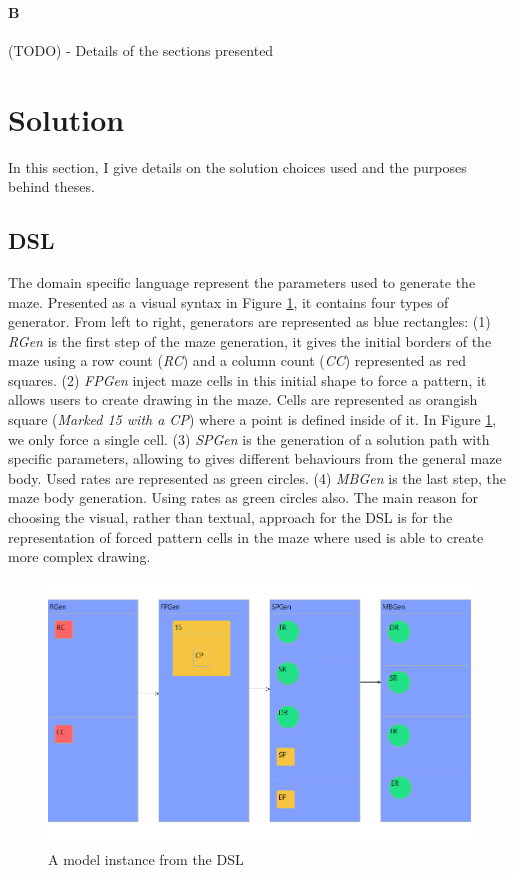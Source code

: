 \documentclass[review]{elsarticle}
\begin{document}
\paragraph{B}
(TODO) - Details of the sections presented

\section{Solution}

In this section, I give details on the solution choices used and the purposes behind theses.

\subsection{DSL}
The domain specific language represent the parameters used to generate the maze. Presented as a visual syntax in Figure \ref{fig:model}, it contains four types of generator. From left to right, generators are represented as blue rectangles: (1) \textit{RGen} is the first step of the maze generation, it gives the initial borders of the maze using a row count (\textit{RC}) and a column count (\textit{CC}) represented as red squares. (2) \textit{FPGen} inject maze cells in this initial shape to force a pattern, it allows users to create drawing in the maze. Cells are represented as orangish square (\textit{Marked 15 with a CP}) where a point is defined inside of it. In Figure \ref{fig:model}, we only force a single cell. (3) \textit{SPGen} is the generation of a solution path with specific parameters, allowing to gives different behaviours from the general maze body. Used rates are represented as green circles. (4) \textit{MBGen} is the last step, the maze body generation. Using rates as green circles also. The main reason for choosing the visual, rather than textual, approach for the DSL  is for the representation of forced pattern cells in the maze where used is able to create more complex drawing.

\begin{figure}
	\includegraphics[width=\linewidth]{model.png}
	\caption{A model instance from the DSL}
	\label{fig:model}
\end{figure}
\end{document}
